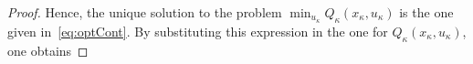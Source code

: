 \documentclass[10pt]{IEEEtran}      %
\newcommand{\tr}{\mathrm{tr}}
\theoremstyle{theorem}
\theoremstyle{remark}
\begin{document}
\begin{proof}
Hence, the unique solution to the problem $\min_{u_\kappa}Q_\kappa(x_\kappa,u_\kappa)$ is the one given in~\eqref{eq:optCont}.
By substituting this expression in the one for $Q_\kappa(x_\kappa,u_\kappa)$, one obtains

\end{proof}
\end{document}
